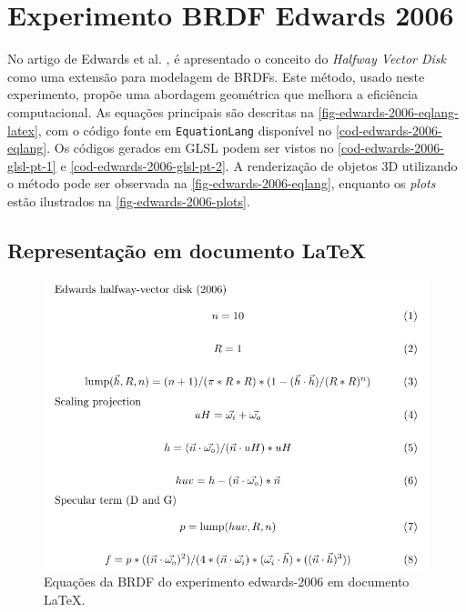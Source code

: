 \section{Experimento BRDF Edwards 2006}

No artigo de Edwards et al. \cite{edwards2006halfway}, é apresentado o conceito do \textit{Halfway Vector Disk} como uma extensão para modelagem de BRDFs. Este método, usado neste experimento, propõe uma abordagem geométrica que melhora a eficiência computacional. As equações principais são descritas na \autoref{fig-edwards-2006-eqlang-latex}, com o código fonte em \texttt{EquationLang} disponível no \autoref{cod-edwards-2006-eqlang}. Os códigos gerados em GLSL podem ser vistos no \autoref{cod-edwards-2006-glsl-pt-1} e \autoref{cod-edwards-2006-glsl-pt-2}. A renderização de objetos 3D utilizando o método pode ser observada na \autoref{fig-edwards-2006-eqlang}, enquanto os \textit{plots} estão ilustrados na \autoref{fig-edwards-2006-plots}.

\subsection{Representação em documento \LaTeX{}}
\begin{figure}[H]
    \caption{\label{fig-edwards-2006-eqlang-latex} \small Equações da BRDF do experimento edwards-2006 em documento \LaTeX{}.}
    \begin{center}
        \includegraphics[scale=0.92]{./Imagens/brdfs/edwards-2006.pdf}
    \end{center}
\end{figure}

